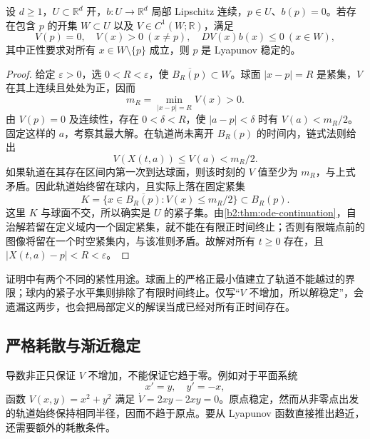 \begin{theorem}\label{b2:thm:ode-lyapunov-stable}
设 \(d\geq1\)，\(U\subset\mathbb R^d\) 开，\(b:U\to\mathbb R^d\) 局部 Lipschitz 连续，\(p\in U\)、\(b(p)=0\)。若存在包含 \(p\) 的开集 \(W\subset U\) 以及 \(V\in C^1(W;\mathbb R)\)，满足
\[
 V(p)=0,\quad V(x)>0\ (x\ne p),\quad
 DV(x)b(x)\leq0\ (x\in W),
\]
其中正性要求对所有 \(x\in W\setminus\{p\}\) 成立，则 \(p\) 是 Lyapunov 稳定的。
\end{theorem}
\begin{proof}
给定 \(\varepsilon>0\)，选 \(0<R<\varepsilon\)，使 \(\overline{B_R(p)}\subset W\)。球面 \(|x-p|=R\) 是紧集，\(V\) 在其上连续且处处为正，因而
\[
 m_R=\min_{|x-p|=R}V(x)>0.
\]
由 \(V(p)=0\) 及连续性，存在 \(0<\delta<R\)，使 \(|a-p|<\delta\) 时有 \(V(a)<m_R/2\)。固定这样的 \(a\)，考察其最大解。在轨道尚未离开 \(B_R(p)\) 的时间内，链式法则给出
\[
 V(X(t,a))\leq V(a)<m_R/2.
\]
如果轨道在其存在区间内第一次到达球面，则该时刻的 \(V\) 值至少为 \(m_R\)，与上式矛盾。因此轨道始终留在球内，且实际上落在固定紧集
\[
 K=\{x\in\overline{B_R(p)}:V(x)\leq m_R/2\}\subset B_R(p).
\]
这里 \(K\) 与球面不交，所以确实是 \(U\) 的紧子集。由\cref{b2:thm:ode-continuation}，自治解若留在定义域内一个固定紧集，就不能在有限正时间终止；否则有限端点前的图像将留在一个时空紧集内，与该准则矛盾。故解对所有 \(t\geq0\) 存在，且 \(|X(t,a)-p|<R<\varepsilon\)。
\end{proof}

证明中有两个不同的紧性用途。球面上的严格正最小值建立了轨道不能越过的界限；球内的紧子水平集则排除了有限时间终止。仅写“\(V\) 不增加，所以解稳定”，会遗漏这两步，也会把局部定义的解误当成已经对所有正时间存在。

\subsection{严格耗散与渐近稳定}
\label{b2:subsec:ode-lyapunov-asymptotic}

导数非正只保证 \(V\) 不增加，不能保证它趋于零。例如对于平面系统
\[
 x'=y,\quad y'=-x,
\]
函数 \(V(x,y)=x^2+y^2\) 满足 \(\dot V=2xy-2xy=0\)。原点稳定，然而从非零点出发的轨道始终保持相同半径，因而不趋于原点。要从 Lyapunov 函数直接推出趋近，还需要额外的耗散条件。

